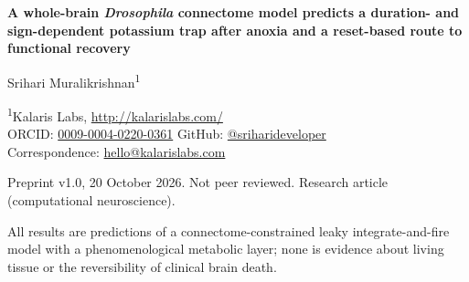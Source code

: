 \documentclass[11pt]{article}
\newcounter{none}
\begin{document}
\begin{center}
{\LARGE\bfseries A whole-brain \emph{Drosophila} connectome model predicts a duration- and sign-dependent potassium trap after anoxia and a reset-based route to functional recovery\par}
\vspace{1.2em}
{\large Srihari Muralikrishnan\textsuperscript{1}\par}
\vspace{0.4em}
{\small \textsuperscript{1}Kalaris Labs, \url{http://kalarislabs.com/}\\
ORCID: \href{https://orcid.org/0009-0004-0220-0361}{0009-0004-0220-0361} \quad GitHub: \href{https://github.com/sriharideveloper}{@sriharideveloper}\\
Correspondence: \href{mailto:hello@kalarislabs.com}{hello@kalarislabs.com}\par}
\vspace{0.6em}
{\footnotesize Preprint v1.0, 20 October 2026. Not peer reviewed. Research article (computational neuroscience).\par
\begin{minipage}{0.85\linewidth}\centering All results are predictions of a connectome-constrained leaky integrate-and-fire model with a phenomenological metabolic layer; none is evidence about living tissue or the reversibility of clinical brain death.\end{minipage}\par}
\end{center}
\vspace{0.4em}
\end{document}
